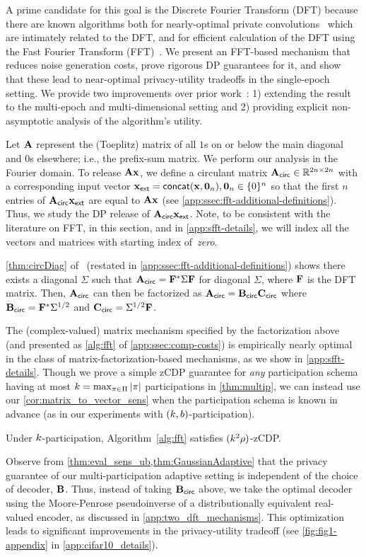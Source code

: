 \documentclass{article} %
\theoremstyle{named}
\begin{document}
A prime candidate for this goal is the Discrete Fourier Transform (DFT) because there are known algorithms both for nearly-optimal private convolutions~\citep{fawaz2013nearly} which are intimately related to the DFT,
and for efficient calculation of the DFT using the Fast Fourier Transform (FFT)~\citep{cooley1965algorithm,nussbaumer1981fast}. 
We present an FFT-based mechanism that reduces noise generation costs, prove rigorous DP guarantees for it, and show that these lead to near-optimal privacy-utility tradeoffs in the single-epoch setting. We provide two improvements over prior work~\cite{fawaz2013nearly}: 1) extending the result to the multi-epoch and multi-dimensional setting and 2) providing explicit non-asymptotic analysis of the algorithm's utility.%

Let $\mathbf{A}$ represent the (Toeplitz) matrix of all $1$s on or below the main diagonal and $0$s elsewhere; i.e., the prefix-sum matrix. We perform our analysis in the Fourier domain. To release $\mathbf{A}\mathbf{x}$, we define a circulant matrix $\mathbf{A}_{\sf circ}\in\mathbb{R}^{2n\times 2n}$
with a corresponding input vector $\mathbf{x}_{\sf ext}={\sf concat}(\mathbf{x},{\bf0}_n),{\bf0}_n\in\{0\}^n$ so that the first $n$ entries of $\mathbf{A}_{\sf circ}\mathbf{x}_{\sf ext}$ are equal to $\mathbf{A}\mathbf{x}$ (see \cref{app:ssec:fft-additional-definitions}). Thus, we study the DP release of $\mathbf{A}_{\sf circ}\mathbf{x}_{\sf ext}$. 
Note, to be consistent with the literature on FFT, in this section, and in \cref{app:sfft-details}, we will index all the vectors and matrices with starting index of~\emph{zero}. 
 
\cref{thm:circDiag} of~\citet{gray2006toeplitz} (restated in \cref{app:ssec:fft-additional-definitions}) shows there exists a diagonal $\Sigma$ such that $\mathbf{A}_{\sf circ}=\mathbf{F}^*\Sigma\mathbf{F}$ for diagonal $\Sigma$, where $\mathbf{F}$ is the DFT matrix.  Then, $\mathbf{A}_{\sf circ}$ can then be factorized as  $\mathbf{A}_{\sf circ}=\mathbf{B}_{\sf circ}\mathbf{C}_{\sf circ}$ where $\mathbf{B}_{\sf circ}=\mathbf{F}^*\Sigma^{1/2}$ and $\mathbf{C}_{\sf circ}=\Sigma^{1/2}\mathbf{F}$. 


The (complex-valued) matrix mechanism specified by the factorization above (and presented as \cref{alg:fft} of \cref{app:ssec:comp-costs}) is empirically nearly optimal in the class of matrix-factorization-based mechanisms, as we show in \cref{app:sfft-details}. Though we prove a simple zCDP guarantee for \emph{any} participation schema having at most $k = \max_{\pi \in \Pi} |\pi|$ participations in \cref{thm:multip}, we can instead use our \cref{cor:matrix_to_vector_sens} when the participation schema is known in advance (as in our experiments with $(k,b)$-participation).
\begin{thm}
Under $k$-participation, Algorithm~\ref{alg:fft} satisfies $(k^2\rho)$-zCDP.
\label{thm:multip}
\end{thm}
 Observe from \cref{thm:eval_sens_ub,thm:GaussianAdaptive} that the privacy guarantee of our multi-participation adaptive setting is independent of the choice of decoder, $\mathbf{B}$. Thus, instead of taking $\mathbf{B}_{\sf circ}$ above, we take the optimal decoder using the Moore-Penrose pseudoinverse of a distributionally equivalent real-valued encoder, as discussed in \cref{app:two_dft_mechanisms}.
This optimization leads to significant improvements in the privacy-utility tradeoff (see \cref{fig:fig1-appendix} in \cref{app:cifar10_details}).
\end{document}
